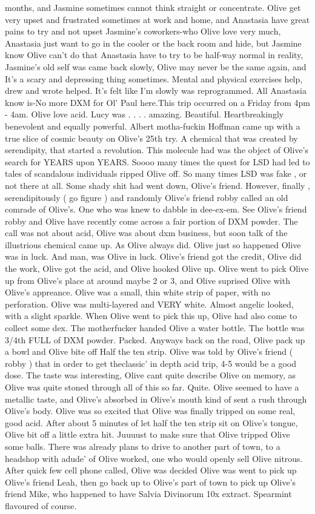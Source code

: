 \documentclass[12pt]{book}
\begin{document}
months, and Jasmine sometimes cannot think straight or concentrate. Olive get very upset and frustrated sometimes at work and home, and Anastasia have great pains to try and not upset Jasmine's coworkers-who Olive love very much, Anastasia just want to go in the cooler or the back room and hide, but Jasmine know Olive can't do that Anastasia have to try to be half-way normal in reality, Jasmine's old self was came back slowly, Olive may never be the same again, and It's a scary and depressing thing sometimes. Mental and physical exercises help, drew and wrote helped. It's felt like I'm slowly was reprogrammed. All Anastasia know is-No more DXM for Ol' Paul here.This trip occurred on a Friday from 4pm - 4am. Olive love acid. Lucy was  . . .  . amazing. Beautiful. Heartbreakingly benevolent and equally powerful. Albert motha-fuckin Hoffman came up with a true slice of cosmic beauty on Olive's 25th try. A chemical that was created by serendipity, that started a revolution. This molecule had was the object of Olive's search for YEARS upon YEARS. Soooo many times the quest for LSD had led to tales of scandalous individuals ripped Olive off. So many times LSD was fake , or not there at all. Some shady shit had went down, Olive's friend. However, finally , serendipitously ( go figure ) and randomly Olive's friend robby called an old comrade of Olive's. One who was knew to dabble in dee-ex-em. See Olive's friend robby and Olive have recently come across a fair portion of DXM powder. The call was not about acid, Olive was about dxm business, but soon talk of the illustrious chemical came up. As Olive always did. Olive just so happened Olive was in luck. And man, was Olive in luck. Olive's friend got the credit, Olive did the work, Olive got the acid, and Olive hooked Olive up. Olive went to pick Olive up from Olive's place at around maybe 2 or 3, and Olive suprised Olive with Olive's appreance. Olive was a small, thin white strip of paper, with no perforation. Olive was multi-layered and VERY white. Almost angelic looked, with a slight sparkle. When Olive went to pick this up, Olive had also come to collect some dex. The motherfucker handed Olive a water bottle. The bottle was 3/4th FULL of DXM powder. Packed. Anyways back on the road, Olive pack up a bowl and Olive bite off Half the ten strip. Olive was told by Olive's friend ( robby ) that in order to get theclassic' in depth acid trip, 4-5 would be a good dose. The taste was interesting, Olive cant quite describe Olive on memory, as Olive was quite stoned through all of this so far. Quite. Olive seemed to have a metallic taste, and Olive's absorbed in Olive's mouth kind of sent a rush through Olive's body. Olive was so excited that Olive was finally tripped on some real, good acid. After about 5 minutes of let half the ten strip sit on Olive's tongue, Olive bit off a little extra hit. Juuuust to make sure that Olive tripped Olive some balls. There was already plans to drive to another part of town, to a headshop with adude' of Olive worked, one who would openly sell Olive nitrous. After quick few cell phone called, Olive was decided Olive was went to pick up Olive's friend Leah, then go back up to Olive's part of town to pick up Olive's friend Mike, who happened to have Salvia Divinorum 10x extract. Spearmint flavoured of course. 
\end{document}
